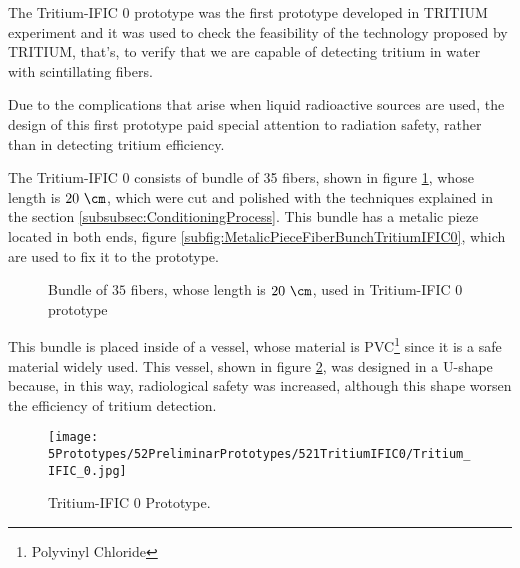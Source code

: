 The Tritium-IFIC 0 prototype was the first prototype developed in TRITIUM experiment and it was used to check the feasibility of the technology proposed by TRITIUM, that's, to verify that we are capable of detecting tritium in water with scintillating fibers.

Due to the complications that arise when liquid radioactive sources are used, the design of this first prototype paid special attention to radiation safety, rather than in detecting tritium efficiency.

The Tritium-IFIC 0 consists of bundle of 35 fibers, shown in figure \ref{fig:FiberBundleOfTritiumIFIC0}, whose length is $20~\cm$, which were cut and polished with the techniques explained in the section \ref{subsubsec:ConditioningProcess}. This bundle has a metalic pieze located in both ends, figure \ref{subfig:MetalicPieceFiberBunchTritiumIFIC0}, which are used to fix it to the prototype.

\begin{figure}[h]
 \centering
    \newline
 \caption{Bundle of $35$ fibers, whose length is $20~\cm$, used in Tritium-IFIC 0 prototype}
 \label{fig:FiberBundleOfTritiumIFIC0}
\end{figure}

This bundle is placed inside of a vessel, whose material is PVC\footnote{Polyvinyl Chloride}  since it is a safe material widely used. This vessel, shown in figure \ref{fig:TritiumIFIC0}, was designed in a U-shape because, in this way, radiological safety was increased, although this shape worsen the efficiency of tritium detection.

\begin{figure}[h]
\centering
\texttt{[image: 5Prototypes/52PreliminarPrototypes/521TritiumIFIC0/Tritium\_IFIC\_0.jpg]}
\caption{Tritium-IFIC 0 Prototype.\label{fig:TritiumIFIC0}}
\end{figure}

